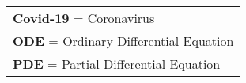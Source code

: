 \newpage
{}

\begin{Listofabbreviations}

\begin{center}
    \begin{tabular}{@{}l@{}}
    \textbf{Covid-19} = Coronavirus \\
    \textbf{ODE} = Ordinary Differential Equation \\
    \textbf{PDE} = Partial Differential Equation \\
    \end{tabular}
\end{center}

\end{Listofabbreviations}